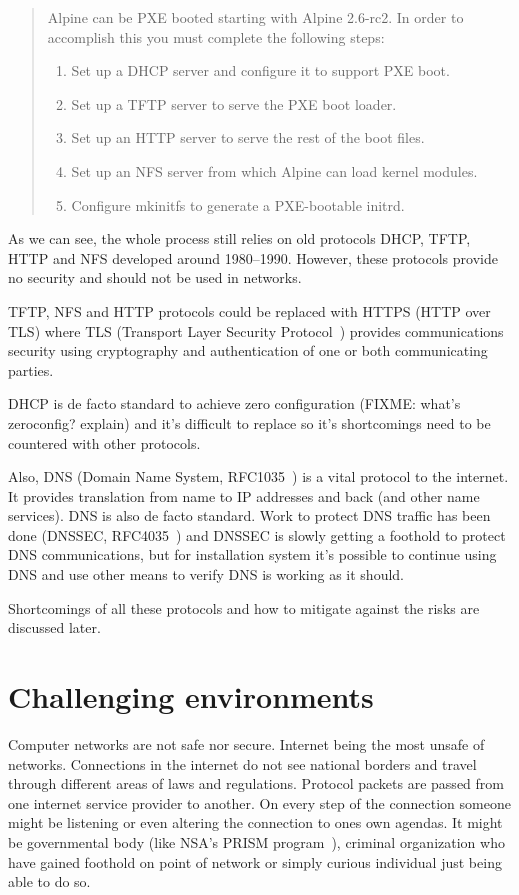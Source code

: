 \begin{quote}
Alpine can be PXE booted starting with Alpine 2.6-rc2. In order to
accomplish this you must complete the following steps:

\begin{enumerate}
\item Set up a DHCP server and configure it to support PXE boot.
\item Set up a TFTP server to serve the PXE boot loader.
\item Set up an HTTP server to serve the rest of the boot files.
\item Set up an NFS server from which Alpine can load kernel modules.
\item Configure mkinitfs to generate a PXE-bootable initrd.
\end{enumerate}
\end{quote}

As we can see, the whole process still relies on old protocols DHCP,
TFTP, HTTP and NFS developed around 1980--1990. However, these
protocols provide no security and should not be used in networks.

TFTP, NFS and HTTP protocols could be replaced with HTTPS (HTTP over
TLS) where TLS (Transport Layer Security Protocol~\cite{RFC5246})
provides communications security using cryptography and authentication
of one or both communicating parties.

DHCP is de facto standard to achieve zero configuration (FIXME: what's
zeroconfig? explain) and it's difficult to replace so it's
shortcomings need to be countered with other protocols.

Also, DNS (Domain Name System, RFC1035~\cite{rfc1035}) is a vital
protocol to the internet. It provides translation from name to IP
addresses and back (and other name services). DNS is also de facto
standard. Work to protect DNS traffic has been done (DNSSEC,
RFC4035~\cite{rfc4035}) and DNSSEC is slowly getting a foothold to
protect DNS communications, but for installation system it's possible
to continue using DNS and use other means to verify DNS is working as
it should.

Shortcomings of all these protocols and how to mitigate against the
risks are discussed later.

\section{Challenging environments}

Computer networks are not safe nor secure. Internet being the most
unsafe of networks. Connections in the internet do not see national
borders and travel through different areas of laws and
regulations. Protocol packets are passed from one internet service
provider to another. On every step of the connection someone might be
listening or even altering the connection to ones own agendas. It
might be governmental body (like NSA's PRISM
program~\cite{nsa-prism}), criminal organization who have gained
foothold on point of network or simply curious individual just being
able to do so.

